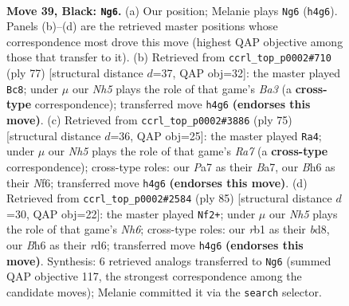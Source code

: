 \documentclass[11pt]{article}
\begin{document}
\clearpage

\begin{figure}[p]\centering
\begin{subfigure}{0.46\textwidth}\centering
\resizebox{\linewidth}{!}{%
\newchessgame
\chessboard[
  setfen={3r4/p5k1/Pp5b/5p2/2B1pP1n/8/5K2/1RB5 b - - 11 39},
  showmover=false,
  pgfstyle=straightmove, color=movearrow, markmove={h4-g6}
]}
\caption{}
\end{subfigure}\hfill
\begin{subfigure}{0.46\textwidth}\centering
\resizebox{\linewidth}{!}{%
\newchessgame
\chessboard[
  setfen={3B4/2P2pk1/b5p1/3Bb3/6P1/p7/P7/7K b - - 0 39},
  showmover=false,
  pgfstyle=straightmove, color=movearrow, markmove={a6-c8}
]}
\caption{}
\end{subfigure}
\\[4pt]
\begin{subfigure}{0.46\textwidth}\centering
\resizebox{\linewidth}{!}{%
\newchessgame
\chessboard[
  setfen={8/b4p1k/4pn1p/8/4PP2/3R1B1P/r7/4BK2 b - - 0 38},
  showmover=false,
  pgfstyle=straightmove, color=movearrow, markmove={a2-a4}
]}
\caption{}
\end{subfigure}\hfill
\begin{subfigure}{0.46\textwidth}\centering
\resizebox{\linewidth}{!}{%
\newchessgame
\chessboard[
  setfen={3B4/5pk1/p2R4/Pb2P1p1/6P1/5B1n/2r5/7K b - - 6 43},
  showmover=false,
  pgfstyle=straightmove, color=movearrow, markmove={h3-f2}
]}
\caption{}
\end{subfigure}
\caption{\textbf{Move 39, Black: \texttt{Ng6}.} (a) Our position; Melanie plays \texttt{Ng6} (\texttt{h4g6}). Panels (b)--(d) are the retrieved master positions whose correspondence most drove this move (highest QAP objective among those that transfer to it). (b) Retrieved from \texttt{ccrl\_top\_p0002\#710} (ply 77) [structural distance $d$=37, QAP obj=32]: the master played \texttt{Bc8}; under $\mu$ our \emph{Nh5} plays the role of that game's \emph{Ba3} (a \textbf{cross-type} correspondence); transferred move \texttt{h4g6} \textbf{(endorses this move)}. (c) Retrieved from \texttt{ccrl\_top\_p0002\#3886} (ply 75) [structural distance $d$=36, QAP obj=25]: the master played \texttt{Ra4}; under $\mu$ our \emph{Nh5} plays the role of that game's \emph{Ra7} (a \textbf{cross-type} correspondence); cross-type roles: our \emph{P}a7 as their \emph{B}a7, our \emph{B}h6 as their \emph{N}f6; transferred move \texttt{h4g6} \textbf{(endorses this move)}. (d) Retrieved from \texttt{ccrl\_top\_p0002\#2584} (ply 85) [structural distance $d$=30, QAP obj=22]: the master played \texttt{Nf2+}; under $\mu$ our \emph{Nh5} plays the role of that game's \emph{Nh6}; cross-type roles: our \emph{r}b1 as their \emph{b}d8, our \emph{B}h6 as their \emph{r}d6; transferred move \texttt{h4g6} \textbf{(endorses this move)}. Synthesis: 6 retrieved analogs transferred to \texttt{Ng6} (summed QAP objective 117, the strongest correspondence among the candidate moves); Melanie committed it via the \texttt{search} selector.}
\label{fig:thought-m77}
\end{figure}
\end{document}
